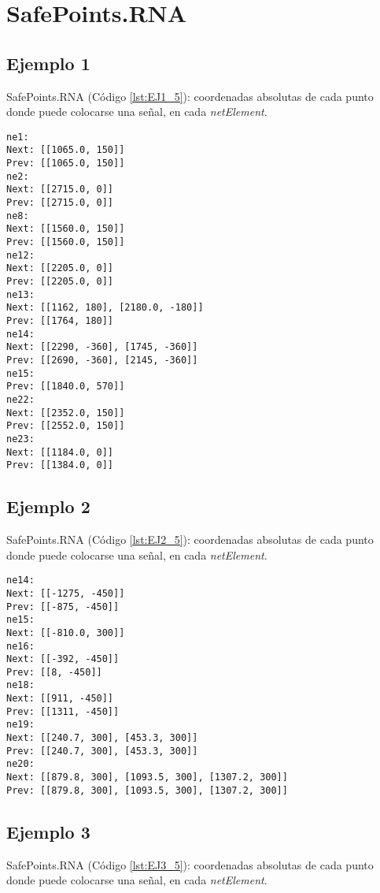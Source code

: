\chapter{SafePoints.RNA}
	\label{sec:safePointsRNA}
	
	\section{Ejemplo 1}
		SafePoints.RNA (Código \ref{lst:EJ1_5}): coordenadas absolutas de cada punto donde puede colocarse una señal, en cada \textit{netElement}.
		
		\begin{lstlisting}[language = {}, caption = SafePoints.RNA, label = {lst:EJ1_6}]
ne1:
Next: [[1065.0, 150]]
Prev: [[1065.0, 150]]
ne2:
Next: [[2715.0, 0]]
Prev: [[2715.0, 0]]
ne8:
Next: [[1560.0, 150]]
Prev: [[1560.0, 150]]
ne12:
Next: [[2205.0, 0]]
Prev: [[2205.0, 0]]
ne13:
Next: [[1162, 180], [2180.0, -180]]
Prev: [[1764, 180]]
ne14:
Next: [[2290, -360], [1745, -360]]
Prev: [[2690, -360], [2145, -360]]
ne15:
Prev: [[1840.0, 570]]
ne22:
Next: [[2352.0, 150]]
Prev: [[2552.0, 150]]
ne23:
Next: [[1184.0, 0]]
Prev: [[1384.0, 0]]
		\end{lstlisting}	
	\section{Ejemplo 2}
	SafePoints.RNA (Código \ref{lst:EJ2_5}): coordenadas absolutas de cada punto donde puede colocarse una señal, en cada \textit{netElement}.
	
	\begin{lstlisting}[language = {}, caption = SafePoints.RNA, label = {lst:EJ2_5}]
ne14:
Next: [[-1275, -450]]
Prev: [[-875, -450]]
ne15:
Next: [[-810.0, 300]]
ne16:
Next: [[-392, -450]]
Prev: [[8, -450]]
ne18:
Next: [[911, -450]]
Prev: [[1311, -450]]
ne19:
Next: [[240.7, 300], [453.3, 300]]
Prev: [[240.7, 300], [453.3, 300]]
ne20:
Next: [[879.8, 300], [1093.5, 300], [1307.2, 300]]
Prev: [[879.8, 300], [1093.5, 300], [1307.2, 300]]
	\end{lstlisting}	
	\section{Ejemplo 3}
SafePoints.RNA (Código \ref{lst:EJ3_5}): coordenadas absolutas de cada punto donde puede colocarse una señal, en cada \textit{netElement}.

